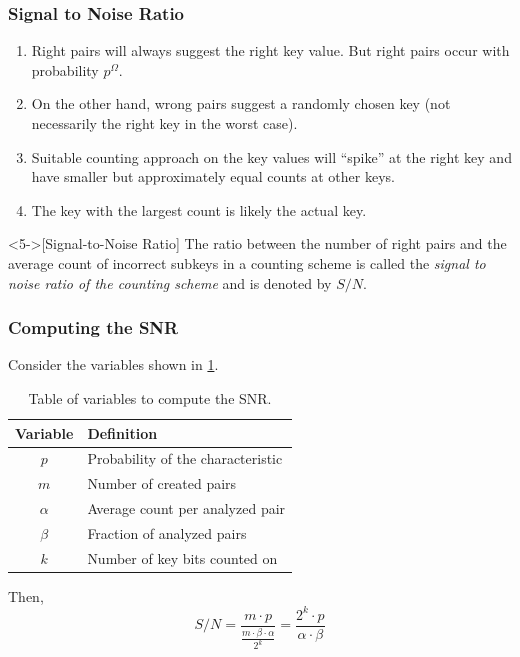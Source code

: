 \documentclass{beamer}
\begin{document}
    \begin{frame}
        \frametitle{Signal to Noise Ratio}
        \begin{enumerate}
            \item Right pairs will always suggest the right key value. But right
            pairs occur with probability \(p^\Omega\).
            \item<2-> On the other hand, wrong pairs suggest a randomly chosen
            key (not necessarily the right key in the worst case).
            \item<3-> Suitable counting approach on the key values will
            ``spike'' at the right key and have smaller but approximately equal
            counts at other keys.
            \item<4-> The key with the largest count is likely the actual key.
        \end{enumerate}
        \begin{definition}<5->[Signal-to-Noise Ratio]
            The ratio between the number of right pairs and the average count of
            incorrect subkeys in a counting scheme is called the \emph{signal to
            noise ratio of the counting scheme} and is denoted by \(S/N\).
        \end{definition}
    \end{frame}

    \begin{frame}
        \frametitle{Computing the SNR}
        Consider the variables shown in \cref{tab:snr-vars}.
        \begin{table}[!ht]
            \centering
            \begin{tabular}{|c|l|}
                \hline
                \textbf{Variable} & \textbf{Definition} \\
                \hline
                \(p\) & Probability of the characteristic \\
                \hline
                \(m\) & Number of created pairs \\
                \hline
                \(\alpha\) & Average count per analyzed pair \\
                \hline
                \(\beta\) & Fraction of analyzed pairs \\
                \hline
                \(k\) & Number of key bits counted on \\
                \hline
            \end{tabular}
            \caption{Table of variables to compute the SNR.}
            \label{tab:snr-vars}
        \end{table}
        \pause
        Then,
        \begin{equation}
            S/N = \frac{m \cdot p}{\frac{m \cdot \beta \cdot \alpha}{2^k}} = \frac{2^k \cdot p}{\alpha \cdot \beta}
            \label{eq:snr-expr}
        \end{equation}
    \end{frame}
\end{document}
